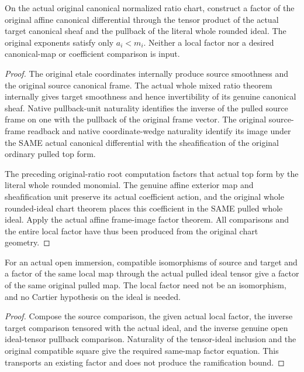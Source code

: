 \begin{lemma}
\label{lem:kn-nadel-bounded-original-ratio-sheaf-factor}
\leanok
{}
On the actual original canonical normalized ratio chart, construct a factor
of the original affine canonical differential through the tensor product of
the actual target canonical sheaf and the pullback of the literal whole
rounded ideal. The original exponents satisfy only $a_i<m_i$. Neither a
local factor nor a desired canonical-map or coefficient comparison is input.
\end{lemma}
\begin{proof}
The original etale coordinates internally produce source smoothness and
the original source canonical frame. The actual whole mixed ratio theorem
internally gives target smoothness and hence invertibility of its genuine
canonical sheaf. Native pullback-unit naturality identifies the inverse
of the pulled source frame on one with the pullback of the original frame
vector. The original source-frame readback and native coordinate-wedge
naturality identify its image under the SAME actual canonical differential
with the sheafification of the original ordinary pulled top form.

The preceding original-ratio root computation factors that actual top form
by the literal whole rounded monomial. The genuine affine exterior map and
sheafification unit preserve its actual coefficient action, and the original
whole rounded-ideal chart theorem places this coefficient in the SAME
pulled whole ideal. Apply the actual affine frame-image factor theorem.
All comparisons and the entire local factor have thus been produced from
the original chart geometry.
\end{proof}

\begin{lemma}
\label{lem:kn-nadel-bounded-map-factor-transport}
\leanok
{}
For an actual open immersion, compatible isomorphisms of source and target
and a factor of the same local map through the actual pulled ideal tensor
give a factor of the same original pulled map. The local factor need not
be an isomorphism, and no Cartier hypothesis on the ideal is needed.
\end{lemma}
\begin{proof}
Compose the source comparison, the given actual local factor, the inverse
target comparison tensored with the actual ideal, and the inverse genuine
open ideal-tensor pullback comparison. Naturality of the tensor-ideal
inclusion and the original compatible square give the required same-map
factor equation. This transports an existing factor and does not produce
the ramification bound.
\end{proof}

